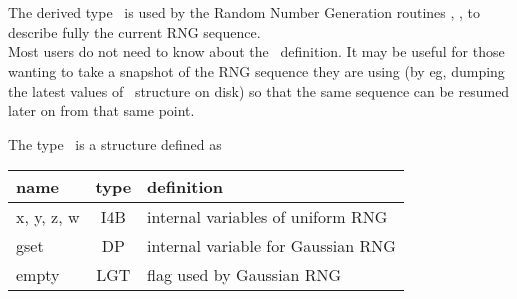 
\sloppy


 \section[planck\_rng derived type]{ }
\label{sub:planck_rng}
\author{Eric Hivon}

\begin{facility}
{The derived type \thedocid\ is used by the Random Number Generation routines 
,
, 
 to describe fully the current RNG
sequence.\\
Most users do not need to know about the \thedocid\ definition. It may be
useful for those wanting to take a snapshot of the RNG sequence they are using (by eg,
dumping the latest values of \thedocid\ structure on disk) so that the same sequence can be resumed
later on from that same point.}
{\modRngmod}
\end{facility}



The type \thedocid\ is a structure defined as

\begin{mytable}{%
\begin{tabularx}{\linewidth}{lcX}
name & type  & definition \\
\hline
x, y, z, w & I4B & internal variables of uniform RNG\\
gset & DP & internal variable for Gaussian RNG\\
empty & LGT & flag used by Gaussian RNG\\
\hline
\end{tabularx}
}%
\end{mytable}




